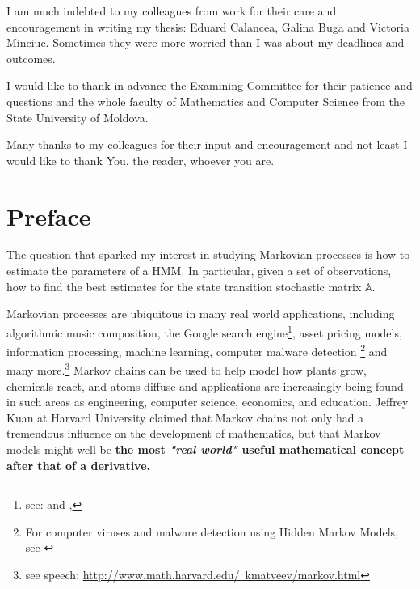 \documentclass[a4paper,12pt]{article}
\theoremstyle{definition}
\begin{document}
I am much indebted to my colleagues from work for their care and encouragement in writing my thesis: Eduard Calancea, Galina Buga and Victoria Minciuc. Sometimes they were more worried than I was about my deadlines and outcomes.

I would like to thank in advance the Examining Committee for their patience and questions and the whole faculty of Mathematics and Computer Science from the State University of Moldova. 

Many thanks to my colleagues for their input and encouragement and not least I would like to thank You, the reader, whoever you are. 
\newpage
\setcounter{secnumdepth}{0}
\section{Preface}
\setcounter{secnumdepth}{1}

The question that sparked my interest in studying Markovian processes is how to estimate the parameters of a HMM. In particular, given a set of observations, how to find the best estimates for the state transition stochastic matrix $\mathbb{A}$.

Markovian processes are ubiquitous in many real world applications, including algorithmic music composition, the Google search engine\footnote{see: \cite{langville2011google} and \cite{Stachurski2008}, }, asset pricing models, information processing, machine learning, computer malware detection \footnote{For computer viruses and malware detection using Hidden Markov Models, see \citep{lin2011hunting} } and many more.\footnote{ see speech: \href{http://www.math.harvard.edu/~kmatveev/markov.html}{http://www.math.harvard.edu/~kmatveev/markov.html}} Markov chains can be used to help model how plants grow, chemicals react, and atoms diffuse and applications are increasingly being found in such areas as engineering, computer science, economics, and education. Jeffrey Kuan at Harvard University claimed that Markov chains not only had a tremendous influence on the development of mathematics, but that Markov models might well be \textbf{ the most \textit{"real world"} useful mathematical concept after that of a derivative.}
\end{document}
